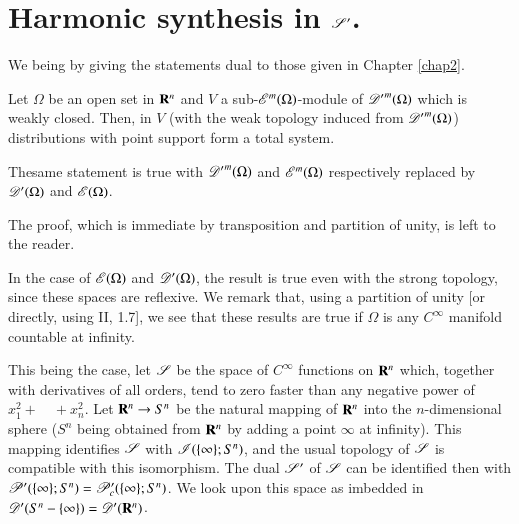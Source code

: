 \section[Harmonic synthesis in $\scrS'$]{Harmonic synthesis in \protect\boldmath$\scrS'$.}\label{chap7-sec3}

We being by giving the statements dual to those given in Chapter \ref{chap2}.

\begin{proposition}\label{chap7-prop3.1}
Let $\Omega$ be an open set in $\mathbf{R}^{n}$ and $V$ a sub-$\mathscr{E}^{m}(\Omega)$-module of ${\mathscr{D}'}^{m}(\Omega)$ which is weakly closed. Then, in $V$ (with the weak topology induced from ${\mathscr{D}'}^{m}(\Omega)$) distributions with point support form a total system.

The\pageoriginale same statement is true with ${\mathscr{D}'}^{m}(\Omega)$ and $\mathscr{E}^{m}(\Omega)$ respectively replaced by $\mathscr{D}'(\Omega)$ and $\mathscr{E}(\Omega)$.
\end{proposition}

The proof, which is immediate by transposition and partition of unity, is left to the reader.

In the case of $\mathscr{E}(\Omega)$ and $\mathscr{D}'(\Omega)$, the result is true even with the strong topology, since these spaces are reflexive. We remark that, using a partition of unity [or directly, using II, 1.7], we see that these results are true if $\Omega$ is any $C^{\infty}$ manifold countable at infinity.

This being the case, let $\mathscr{S}$ be the space of $C^{\infty}$ functions on $\mathbf{R}^{n}$ which, together with derivatives of all orders, tend to zero faster than any negative power of $x^{2}_{1}+\quad+x^{2}_{n}$. Let $\mathbf{R}^{n}\to S^{n}$ be the natural mapping of $\mathbf{R}^{n}$ into the $n$-dimensional sphere ($S^{n}$ being obtained from $\mathbf{R}^{n}$ by adding a point $\infty$ at infinity). This mapping identifies $\mathscr{S}$ with $\mathscr{I}(\{\infty\};S^{n})$, and the usual topology of $\mathscr{S}$ is compatible with this isomorphism. The dual $\scrS'$ of $\mathscr{S}$ can be identified then with $\mathscr{P}'(\{\infty\};S^{n})=\mathscr{P}'_{c}(\{\infty\};S^{n})$. We look upon this space as imbedded in $\mathscr{D}'(S^{n}-\{\infty\})=\mathscr{D}'(\mathbf{R}^{n})$.

